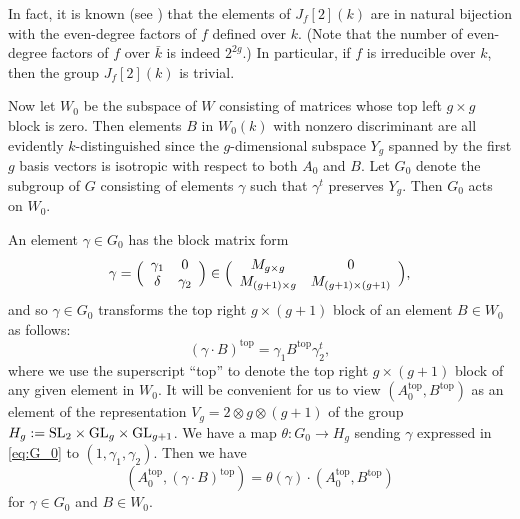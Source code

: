 \documentclass[11pt]{article}
\def\SL{{\rm SL}}
\def\GL{{\rm GL}}
\def\sub{{\textrm{top}}}
\begin{document}
In fact, it is known (see \cite[Proposition~5.1]{BG2}) that the
elements of $J_f[2](k)$ are in natural bijection with the even-degree
factors of $f$ defined over $k$.  (Note that the number of even-degree
factors of $f$ over $\bar k$ is indeed $2^{2g}$.) In particular, if
$f$ is irreducible over $k$, then the group $J_f[2](k)$ is trivial.

Now let $W_0$ be the subspace of $W$ consisting of matrices whose top left
$g\times g$ block is zero. Then elements $B$ in $W_0(k)$ with nonzero
discriminant are all evidently $k$-distinguished since the $g$-dimensional subspace
$Y_g$ spanned by the first $g$ basis vectors is isotropic with respect
to both $A_0$ and $B$.
Let $G_0$ denote the subgroup of $G$
consisting of elements $\gamma$ such that $\gamma^t$ preserves
$Y_g$. Then $G_0$ acts on $W_0$.

An element $\gamma\in G_0$ has the block matrix form
\begin{equation}\label{eq:G_0}
\gamma=\Bigl(\begin{array}{cc}\gamma_1 & 0\\ \delta & \gamma_2
\end{array}\Bigr)\in\Bigl(\begin{array}{cc}M_{g\times g} & 0\\ M_{(g+1)\times g} & M_{(g+1)\times (g+1)}
\end{array}\Bigr),
\end{equation}
and so $\gamma\in G_0$ transforms the top right $g\times (g+1)$ block
of an element $B\in W_0$ as follows:
$$(\gamma\cdot B)^\sub = \gamma_1B^\sub\gamma_2^t,$$ where we use the
superscript ``top'' to denote the top right $g\times (g+1)$ block of
any given element in $W_0$.  It will be convenient for us to view
$(A_0^\sub,B^\sub)$ as an element of the representation $V_g=2\otimes
g\otimes (g+1)$ of the group $H_g:=\SL_2\times\GL_g\times\GL_{g+1}$.
We have a map $\theta:G_0\to H_g$ sending $\gamma$ expressed in \eqref{eq:G_0} to
$(1,\gamma_1,\gamma_2)$. Then we have $$(A_0^\sub,(\gamma\cdot
B)^\sub)=\theta(\gamma)\cdot(A_0^\sub,B^\sub)$$ for $\gamma\in G_0$ and
$B\in W_0$.

\end{document}
